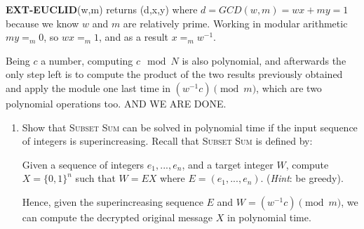 \documentclass[a4paper]{article}
\begin{document}
 \textbf{EXT-EUCLID}(w,m) returns (d,x,y) where $d=GCD(w,m)=wx + my=1$ because we know $w$ and $m$ are relatively prime. Working in modular arithmetic $my=_m0$, so $wx=_m 1$, and as a result $x=_m w^{-1}$.
 
 Being $c$ a number, computing $c \mod{N}$ is also polynomial, and afterwards the only step left is to compute the product of the two results previously obtained and apply the module one last time in $(w^{-1}c) \pmod{m}$, which are two polynomial operations too. AND WE ARE DONE.

\begin{enumerate}[resume, label=\roman*)]
	\item Show that \textsc{Subset Sum} can be solved in polynomial time if the input sequence of integers is superincreasing. Recall that \textsc{Subset Sum} is defined by:
	
	Given a sequence of integers $e_1, ..., e_n$, and a target integer $W$, compute $X = \{0, 1\}^n$ such that $W = EX$ where $E = (e_1, ..., e_n)$. (\emph{Hint}: be greedy).
	
	Hence, given the superincreasing sequence $E$ and $W = (w^{-1}c) \pmod{m}$, we can compute the decrypted original message $X$ in polynomial time.
\end{enumerate}
\end{document}

